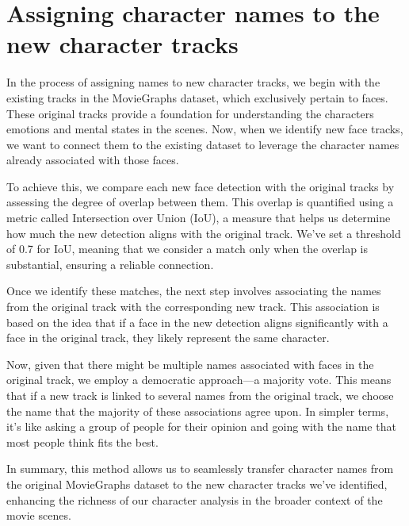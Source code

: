 \section{Assigning character names to the new character tracks}
\label{sec:assigning_names}
In the process of assigning names to new character tracks, we begin with the existing tracks in the MovieGraphs dataset, which exclusively pertain to faces. These original tracks provide a foundation for understanding the characters emotions and mental states in the scenes. Now, when we identify new face tracks, we want to connect them to the existing dataset to leverage the character names already associated with those faces.

To achieve this, we compare each new face detection with the original tracks by assessing the degree of overlap between them. This overlap is quantified using a metric called Intersection over Union (IoU), a measure that helps us determine how much the new detection aligns with the original track. We've set a threshold of 0.7 for IoU, meaning that we consider a match only when the overlap is substantial, ensuring a reliable connection.

Once we identify these matches, the next step involves associating the names from the original track with the corresponding new track. This association is based on the idea that if a face in the new detection aligns significantly with a face in the original track, they likely represent the same character.

Now, given that there might be multiple names associated with faces in the original track, we employ a democratic approach—a majority vote. This means that if a new track is linked to several names from the original track, we choose the name that the majority of these associations agree upon. In simpler terms, it's like asking a group of people for their opinion and going with the name that most people think fits the best.

In summary, this method allows us to seamlessly transfer character names from the original MovieGraphs dataset to the new character tracks we've identified, enhancing the richness of our character analysis in the broader context of the movie scenes.
